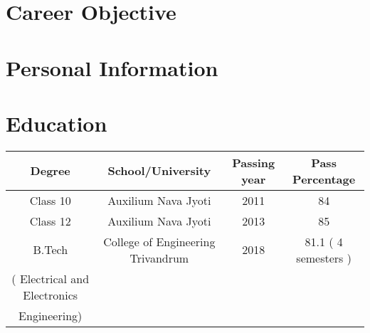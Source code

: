\documentclass[11pt,a4paper,sans]{moderncv} %
\begin{document}

\makecvtitle %


\section{Career Objective}

\section{Personal Information}



\section{Education}
\centering
\begin{tabular}{|c|c|c|c|}
\toprule
    Degree & School/University & Passing year & Pass Percentage\\
    \midrule
    Class 10 & Auxilium Nava Jyoti & 2011 &  84 \\
    Class 12 & Auxilium Nava Jyoti & 2013 & 85 \\
    B.Tech &  College of Engineering Trivandrum & 2018 & 81.1 ( 4 semesters )\\
   ( Electrical and Electronics & & &\\
   Engineering)  & &  & \\  
    \bottomrule
  \end{tabular}
\end{document}
